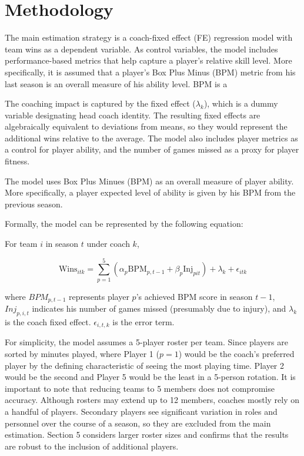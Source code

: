 
\section{Methodology}

The main estimation strategy is a coach-fixed effect (FE) regression model with team wins as a dependent variable. As control variables, the model includes performance-based metrics that help capture a player's relative skill level. More specifically, it is assumed that a player's Box Plus Minus (BPM) metric from his last season is an overall measure of his ability level. BPM is a 

The coaching impact is captured by the fixed effect ($\lambda_{k}$), which is a dummy variable designating head coach identity. The resulting fixed effects are algebraically equivalent to deviations from means, so they would represent the additional wins relative to the average. The model also includes player metrics as a control for player ability, and the number of games missed as a proxy for player fitness. 

The model uses Box Plus Minues (BPM) as an overall measure of player ability. More specifically, a player expected level of ability is given by his BPM from the previous season. 

Formally, the model can be represented by the following equation: 

For team $i$ in season $t$ under coach $k$,

\begin{equation}
\text{Wins}_{itk} = \sum_{p=1}^{5}(\alpha_{p}\text{BPM}_{p,t-1} + \beta_{p}\text{Inj}_{pit}) + \lambda_{k} + \epsilon_{itk}
\end{equation}

where ${BPM}_{p,t-1}$ represents player $p$'s achieved BPM score in season $t-1$, ${Inj}_{p,i,t}$ indicates his number of games missed (presumably due to injury), and $\lambda_{k}$ is the coach fixed effect. $\epsilon_{i,t,k}$ is the error term. 

For simplicity, the model assumes a 5-player roster per team. Since players are sorted by minutes played, where Player 1 ($p = 1$) would be the coach's preferred player by the defining characteristic of seeing the most playing time. Player 2 would be the second and Player 5 would be the least in a 5-person rotation. It is important to note that reducing teams to 5 members does not compromise accuracy. Although rosters may extend up to 12 members, coaches mostly rely on a handful of players. Secondary players see significant variation in roles and personnel over the course of a season, so they are excluded from the main estimation. Section 5 considers larger roster sizes and confirms that the results are robust to the inclusion of additional players.

